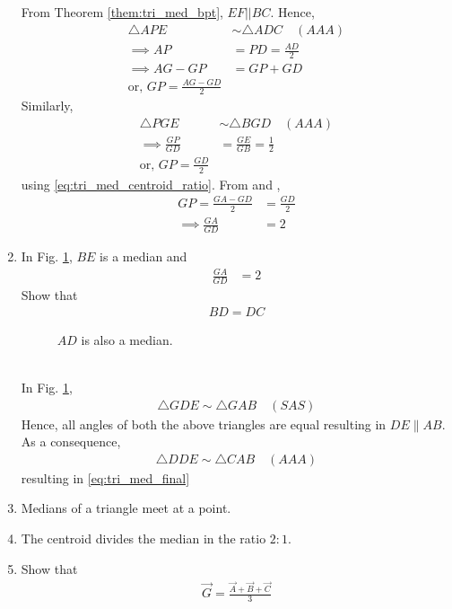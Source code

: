 \begin{enumerate}[label=\arabic*.,ref=\thesubsection.\theenumi]
\solution  From Theorem \ref{them:tri_med_bpt}, $ EF || BC$.  Hence,
%
\begin{align}
\triangle APE &\sim \triangle ADC \quad (AAA)
\\
\implies AP &= PD = \frac{AD}{2}
\\
\implies  AG - GP &= GP + GD 
\\
\text{or, }  GP=\frac{AG - GD}{2} 
\label{eq:tri_med_centroid_ratio_AD1}
\end{align}
%
Similarly, 
%
\begin{align}
\triangle PGE &\sim \triangle BGD  \quad (AAA)
\\
\implies \frac{GP}{GD} &= \frac{GE}{GB} = \frac{1}{2}
\\
\text{or, }  GP=\frac{GD}{2} 
\label{eq:tri_med_centroid_ratio_AD2}
\end{align}
using \eqref{eq:tri_med_centroid_ratio}. From \label{eq:tri_med_centroid_ratio_AD1}
and \label{eq:tri_med_centroid_ratio_AD2},
%
\begin{align}
GP=\frac{GA - GD}{2} &=\frac{GD}{2}  
\\
\implies  \frac{GA}{GD} &=2
\end{align}
\item In Fig. 	\ref{fig:tri_med_meet_proof}, $BE$ is a median and 
%
\begin{align}
\frac{GA}{GD} &=2
\end{align}
%
Show that
%
\begin{align}
\label{eq:tri_med_final}
BD = DC
\end{align}
%
\begin{figure}[!ht]
	\begin{center}
		\resizebox{\columnwidth}{!}{}
	\end{center}
	\caption{$AD$ is also a median. }
	\label{fig:tri_med_meet_proof}	
\end{figure}
%
\\
\solution 	In Fig. \ref{fig:tri_med_meet_proof},
%
\begin{align}
\triangle GDE \sim \triangle GAB \quad (SAS)
\end{align}
%
Hence, all angles of both the above triangles are equal resulting in $DE\parallel AB$. As a consequence, 
%
\begin{align}
\triangle DDE \sim \triangle CAB \quad (AAA)
\end{align}
%
resulting in \eqref{eq:tri_med_final}

\item Medians of a triangle meet at a point.
\label{them:tri_med_meet}
\item The centroid divides the median in the ratio $2:1$.
\label{them:tri_med_ratio}
%
\item Show that 
%
\begin{align}
\vec{G} = \frac{\vec{A}+\vec{B}+\vec{C}}{3}
\end{align}
\end{enumerate}

